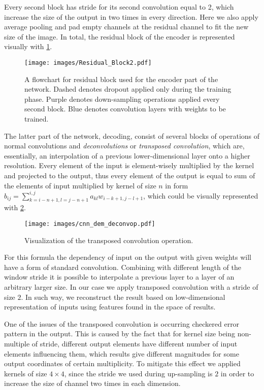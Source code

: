 Every second block has stride for its second convolution equal to 2, which increase the size of the output in two times in every direction.
Here we also apply average pooling and pad empty channels at the residual channel to fit the new size of the image.
In total, the residual block of the encoder is represented visually with \ref{fig:res_block}.
\begin{figure}
	\centering
	\texttt{[image: images/Residual\_Block2.pdf]}
	\label{fig:res_block}
	\caption{A flowchart for residual block used for the encoder part of the network. Dashed denotes dropout applied only during the training phase. Purple denotes down-sampling operations applied every second block. Blue denotes convolution layers with weights to be trained.}
\end{figure}
\medskip

The latter part of the network, decoding, consist of several blocks of operations of normal convolutions and \textit{deconvolutions} or \textit{transposed convolution}, which are, essentially, an interpolation of a previous lower-dimensional layer onto a higher resolution.
Every element of the input is element-wisely multiplied by the kernel and projected to the output, thus every element of the output is equal to sum of the elements of input multiplied by kernel of size $n$ in form $b_{ij} = \sum_{k=i-n+1,l=j-n+1}^{i,j} a_{kl}w_{i-k+1,j-l+1}$, which could be visually represented with \ref{fig:deconv_op}.
\begin{figure}
	\centering
	\texttt{[image: images/cnn\_dem\_deconvop.pdf]}
	\label{fig:deconv_op}
	\caption{Visualization of the transposed convolution operation.}
\end{figure}
For this formula the dependency of input on the output with given weights will have a form of standard convolution.
Combining with different length of the window stride it is possible to interpolate a previous layer to a layer of an arbitrary larger size. 
In our case we apply transposed convolution with a stride of size $2$.
In such way, we reconstruct the result based on low-dimensional representation of inputs using features found in the space of results.
\medskip

One of the issues of the transposed convolution is occurring checkered error pattern in the output.
This is caused by the fact that for kernel size being non-multiple of stride, different output elements have different number of input elements influencing them, which results give different magnitudes for some output coordinates of certain multiplicity.
To mitigate this effect we applied kernels of size $4 \times 4$, since the stride we used during up-sampling is $2$ in order to increase the size of channel two times in each dimension.
\medskip

